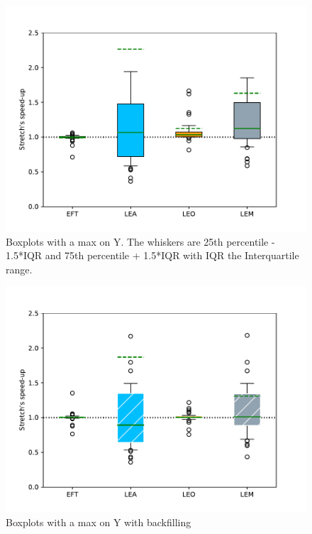 \documentclass[conference,10pt]{IEEEtran}
\begin{document}
\begin{figure}\centering\includegraphics[scale=0.47]{../MBSS/plot/Boxplot/box_plot_mean_stretch_all_workloads.pdf}\caption{Boxplots with a max on Y. The whiskers are 25th percentile - 1.5*IQR and 75th percentile + 1.5*IQR with IQR the Interquartile range.}\end{figure}
\begin{figure}\centering\includegraphics[scale=0.47]{../MBSS/plot/Boxplot/box_plot_mean_stretch_all_workloads_bf.pdf}\caption{Boxplots with a max on Y with backfilling}\end{figure}
\end{document}
